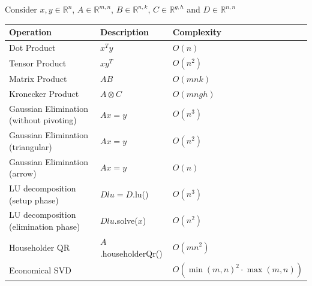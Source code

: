 \documentclass[12pt, a4paper]{article}
\begin{document}
Consider $x, y \in \mathbb{R}^n$, $A \in \mathbb{R}^{m,n}$, $B \in \mathbb{R}^{n,k}$, $C \in \mathbb{R}^{g,h}$ and $D \in \mathbb{R}^{n,n}$

\begin{table}[H]
\centering
\begin{tabular}{|l|l|l|}
\hline
\textbf{Operation} & \textbf{Description} & \textbf{Complexity} \\ \hline
Dot Product 	   & $x^Ty$ 				  & $O(n)$              \\ \hline
Tensor Product	   & $xy^T$               & $O(n^2)$			    \\ \hline
Matrix Product	   & $AB$             	  & $O(mnk)$			    \\ \hline
Kronecker Product  & $A \otimes C$        & $O(mngh)$			\\ \hline
Gaussian Elimination (without pivoting) & $Ax = y$        & $O(n^3)$			\\ \hline
Gaussian Elimination (triangular) & $Ax = y$        & $O(n^2)$			\\ \hline
Gaussian Elimination (arrow) & $Ax = y$        & $O(n)$			\\ \hline
LU decomposition (setup phase) & $Dlu = D$.lu()  & $O(n^3)$			\\ \hline
LU decomposition (elimination phase) & $Dlu$.solve($x$)  & $O(n^2)$			\\ \hline
Householder QR & $A$.householderQr()  & $O(mn^2)$			\\ \hline
Economical SVD & & $O(\min(m, n)^2\cdot\max(m,n))$ \\ \hline
\end{tabular}
\end{table}
\end{document}
